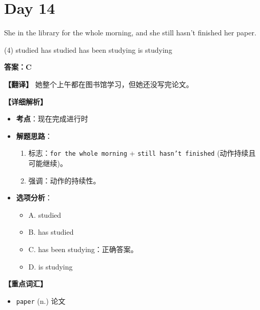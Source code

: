 \documentclass[11pt, a4paper]{article}
\newcommand{\analysis}[4]{
    \begin{solutionbox}
        \textbf{答案：#1}
        
        \textbf{【翻译】} #2
        
        \textbf{【详细解析】}
        #3
        
        \textbf{【重点词汇】}
        #4
    \end{solutionbox}
}
\newcommand{\blank}{\underline{\hspace{1.5cm}}}
\begin{document}
\section*{Day 14}
\begin{questions}
    \item She \blank in the library for the whole morning, and she still hasn’t finished her paper.
    \begin{tasks}(4)
        \task studied \task has studied \task has been studying \task is studying
    \end{tasks}
    \analysis{C}{她整个上午都在图书馆学习，但她还没写完论文。}{
        \begin{itemize}
            \item \textbf{考点}：现在完成进行时
            \item \textbf{解题思路}：
                \begin{enumerate}
                    \item 标志：\texttt{for the whole morning} + \texttt{still hasn't finished} (动作持续且可能继续)。
                    \item 强调：动作的持续性。
                \end{enumerate}
            \item \textbf{选项分析}：
                \begin{itemize}
                    \item A. studied
                    \item B. has studied
                    \item C. has been studying：正确答案。
                    \item D. is studying
                \end{itemize}
        \end{itemize}
    }{
        \begin{itemize}
            \item \texttt{paper} (n.) 论文
        \end{itemize}
    }


\end{questions}
\end{document}
